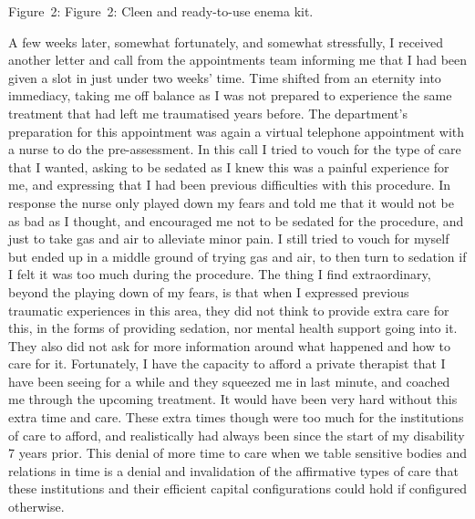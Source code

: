 Figure~2: Figure~2: Cleen and ready-to-use enema kit.

A few weeks later, somewhat fortunately, and somewhat stressfully, I
received another letter and call from the appointments team informing me
that I had been given a slot in just under two weeks' time. Time shifted
from an eternity into immediacy, taking me off balance as I was not
prepared to experience the same treatment that had left me traumatised
years before. The department's preparation for this appointment was
again a virtual telephone appointment with a nurse to do the
pre-assessment. In this call I tried to vouch for the type of care that
I wanted, asking to be sedated as I knew this was a painful experience
for me, and expressing that I had been previous difficulties with this
procedure. In response the nurse only played down my fears and told me
that it would not be as bad as I thought, and encouraged me not to be
sedated for the procedure, and just to take gas and air to alleviate
minor pain. I still tried to vouch for myself but ended up in a middle
ground of trying gas and air, to then turn to sedation if I felt it was
too much during the procedure. The thing I find extraordinary, beyond
the playing down of my fears, is that when I expressed previous
traumatic experiences in this area, they did not think to provide extra
care for this, in the forms of providing sedation, nor mental health
support going into it. They also did not ask for more information around
what happened and how to care for it. Fortunately, I have the capacity
to afford a private therapist that I have been seeing for a while and
they squeezed me in last minute, and coached me through the upcoming
treatment. It would have been very hard without this extra time and
care. These extra times though were too much for the institutions of
care to afford, and realistically had always been since the start of my
disability 7 years prior. This denial of more time to care when we table
sensitive bodies and relations in time is a denial and invalidation of
the affirmative types of care that these institutions and their
efficient capital configurations could hold if configured otherwise.

